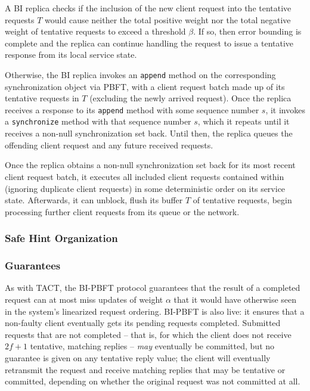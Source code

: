 \documentclass[twocolumn,10pt]{article}
\newcommand{\stitle}[1]{\vspace{2pt}{\bf #1:}}
\newcommand{\method}[1]{{\texttt{\small #1}}}
\begin{document}
\stitle{Error bounding} A BI replica checks if the inclusion of the new
client request into the tentative requests $T$ would cause neither the
total positive weight nor the total negative weight of tentative
requests to exceed a threshold $\beta$. If so, then error bounding is
complete and the replica can continue handling the request to issue a
tentative response from its local service state.

Otherwise, the BI replica invokes an \method{append} method on the
corresponding synchronization object via PBFT, with a client request
batch made up of its tentative requests in $T$ (excluding the newly
arrived request).  Once the replica receives a response to its
\method{append} method with some sequence number $s$, it invokes a
\method{synchronize} method with that sequence number $s$, which it
repeats until it receives a non-null synchronization set back.
Until then, 
the replica queues  the offending client request and
any future received requests.



Once the replica obtains a non-null synchronization set back for its
most recent client request batch, it executes all included client
requests contained within (ignoring duplicate client requests) in some
deterministic order on its service state.  Afterwards, it can unblock,
flush its buffer $T$ of tentative requests, begin
processing further client requests from its queue or the network.








\subsubsection{Safe Hint Organization}



\subsubsection{Guarantees}

As with TACT, the BI-PBFT protocol guarantees that the result of a
completed request can at most miss updates of weight $\alpha$ that it
would have otherwise seen in the system's linearized request ordering.
BI-PBFT is also live: it ensures that a non-faulty client eventually
gets its pending requests completed.
Submitted requests that are not completed -- that is, for which the
client does not receive $2f+1$ tentative, matching replies -- \emph{may} eventually
be committed, but no guarantee is given
on any tentative reply value; the client will eventually retransmit the
request and receive matching replies that may be tentative or committed,
depending on whether the original request was not committed at all.
\end{document}
